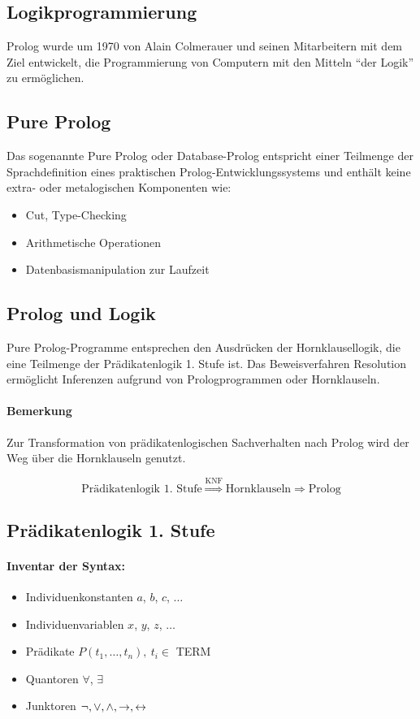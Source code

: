 \documentclass[a4paper]{scrartcl}
\begin{document}
\subsection{Logikprogrammierung}
Prolog wurde um 1970 von Alain Colmerauer und seinen Mitarbeitern mit dem Ziel entwickelt, die Programmierung von Computern mit den Mitteln "`der Logik"' zu ermöglichen.

\subsection{Pure Prolog}
Das sogenannte Pure Prolog oder Database-Prolog entspricht einer Teilmenge der Sprachdefinition eines praktischen Prolog-Entwicklungssystems und enthält keine extra- oder metalogischen Komponenten wie:
\begin{itemize}
\item Cut, Type-Checking
\item Arithmetische Operationen
\item Datenbasismanipulation zur Laufzeit
\end{itemize}

\subsection{Prolog und Logik}
Pure Prolog-Programme entsprechen den Ausdrücken der Hornklausellogik, die eine Teilmenge der Prädikatenlogik 1. Stufe ist.
Das Beweisverfahren Resolution ermöglicht Inferenzen aufgrund von Prologprogrammen oder Hornklauseln.

\paragraph{Bemerkung}Zur Transformation von prädikatenlogischen Sachverhalten nach Prolog wird der Weg über die Hornklauseln genutzt.

$$\text{Prädikatenlogik 1. Stufe} \stackrel{\text{KNF}}{\Longrightarrow} \text{Hornklauseln} \Longrightarrow \text{Prolog}$$

\subsection{Prädikatenlogik 1. Stufe}
\paragraph{Inventar der Syntax:}
\begin{itemize}
\item Individuenkonstanten $a$, $b$, $c$, $\ldots$
\item Individuenvariablen $x$, $y$, $z$, $\ldots$
\item Prädikate $P(t_1, \ldots, t_n),\ t_i \in$ TERM
\item Quantoren $\forall$, $\exists$
\item Junktoren $\neg, \vee, \wedge, \rightarrow, \leftrightarrow$
\end{itemize}
\end{document}
